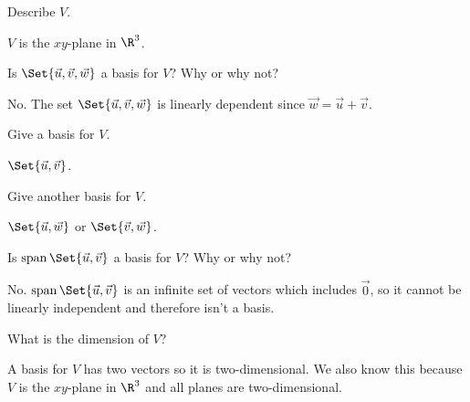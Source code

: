 \documentclass{problemset}
\DeclareMathOperator{\Span}{span}
\begin{document}
	\begin{parts}
		\item Describe $V$.
			\begin{solution}[inline]
				$V$ is the $xy$-plane in $\R^3$.
			\end{solution}
		\item Is $\Set{\vec u,\vec v,\vec w}$ a basis for $V$?  Why or why not?
			\begin{solution}
				No. The set $\Set{\vec u,\vec v,\vec w}$ is linearly dependent since $\vec w=\vec u+\vec v$.
			\end{solution}
		\item Give a basis for $V$.
			\begin{solution}[inline]
				$\Set{\vec u,\vec v}$.
			\end{solution}
		\item Give another basis for $V$.
			\begin{solution}[inline]
				$\Set{\vec u,\vec w}$ or $\Set{\vec v,\vec w}$.
			\end{solution}
		\item Is $\Span\Set{\vec u,\vec v}$ a basis for $V$?  Why or why not?
			\begin{solution}
				No. $\Span\Set{\vec u,\vec v}$ is an infinite set of vectors
				which includes $\vec 0$, so it cannot be linearly independent and
				therefore isn't a basis.
			\end{solution}
		\item What is the dimension of $V$?
			\begin{solution}
				A basis for $V$ has two vectors so it is two-dimensional. We also
				know this because $V$ is the $xy$-plane in $\R^3$ and all planes 
				are two-dimensional.
			\end{solution}
	\end{parts}
\end{document}
